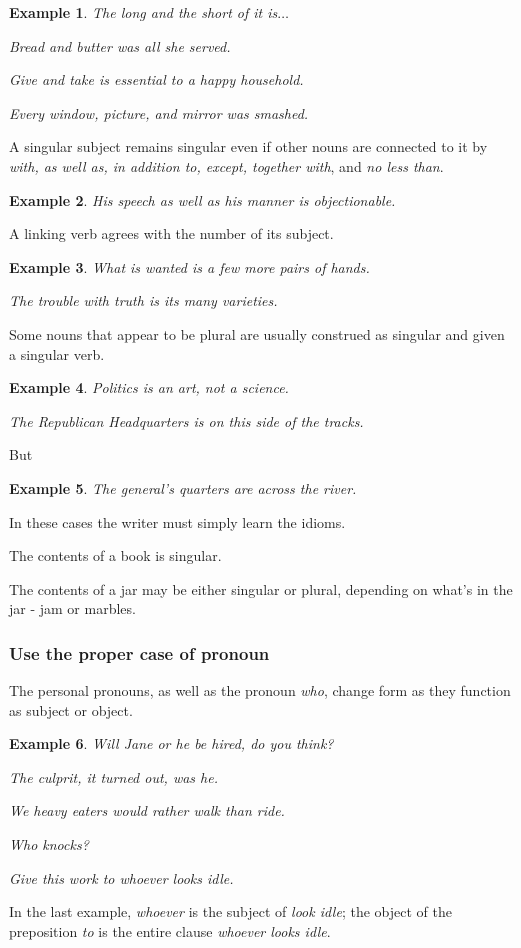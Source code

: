 \documentclass{article}
\newtheorem{example}{Example}
\begin{document}
\begin{example}
	The long and the short of it is$\ldots$
	
	Bread and butter was all she served.
	
	Give and take is essential to a happy household.
	
	Every window, picture, and mirror was smashed.
\end{example}
A singular subject remains singular even if other nouns are connected to it by {\it with, as well as, in addition to, except, together with}, and {\it no less than}.
\begin{example}
	His speech as well as his manner is objectionable.
\end{example}
A linking verb agrees with the number of its subject.
\begin{example}
	What is wanted is a few more pairs of hands.
	
	The trouble with truth is its many varieties.
\end{example}
Some nouns that appear to be plural are usually construed as singular and given a singular verb.
\begin{example}
	Politics is an art, not a science.
	
	The Republican Headquarters is on this side of the tracks.
\end{example}
But
\begin{example}
	The general's quarters are across the river.
\end{example}
In these cases the writer must simply learn the idioms.

The contents of a book is singular.

The contents of a jar may be either singular or plural, depending on what's in the jar - jam or marbles.


\subsubsection{Use the proper case of pronoun}
The personal pronouns, as well as the pronoun {\it who}, change form as they function as subject or object.
\begin{example}
	Will Jane or he be hired, do you think?
	
	The culprit, it turned out, was he.
	
	We heavy eaters would rather walk than ride.
	
	Who knocks?
	
	Give this work to whoever looks idle.
\end{example}
In the last example, {\it whoever} is the subject of {\it look idle}; the object of the preposition {\it to} is the entire clause {\it whoever looks idle}.
\end{document}

